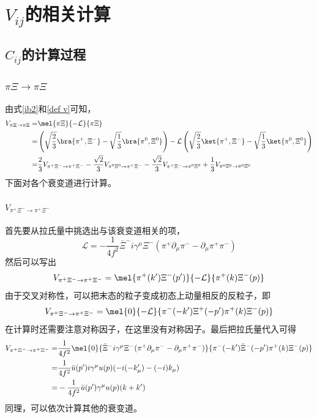 \chapter{$V_{ij}$的相关计算}
\label{appendices a}
\section{$C_{ij}$的计算过程}
\subsection{$\pi\Xi\to\pi\Xi$}
由式\eqref{ib2}和\eqref{def v}可知，
\begin{equation}
\begin{split}
	V_{\pi\Xi\rightarrow\pi\Xi}=&\mel{\pi\Xi}{-\mathcal{L}}{\pi\Xi}\\
	=&\left(\sqrt{\frac{2}{3}}\bra{\pi^{+},\Xi^{-}}-\sqrt{\frac{1}{3}}\bra{\pi^{0},\Xi^{0}}\right)-\mathcal{L}\left(\sqrt{\frac{2}{3}}\ket{\pi^{+},\Xi^{-}}-\sqrt{\frac{1}{3}}\ket{\pi^{0},\Xi^{0}}\right)\\
	=&\frac{2}{3}V_{\pi^{+}\Xi^{-}\rightarrow\pi^{+}\Xi^{-}}-\frac{\sqrt{2}}{3}V_{\pi^{0}\Xi^{0}\rightarrow\pi^{+}\Xi^{-}}-\frac{\sqrt{2}}{3}V_{\pi^{+}\Xi^{-}\rightarrow\pi^{0}\Xi^{0}}+\frac{1}{3}V_{\pi^{0}\Xi^{0}\rightarrow\pi^{0}\Xi^{0}}
\end{split}
\end{equation}
下面对各个衰变道进行计算。
\subsubsection{$V_{\pi^{+}\Xi^{-}\to\pi^{+}\Xi^{-}}$}
首先要从拉氏量中挑选出与该衰变道相关的项，
\begin{equation}
	\mathcal{L}=-\frac{1}{4f^2}\bar{\Xi}^{-}i\gamma^{\mu}\Xi^{-}(\pi^{+}\partial_{\mu}\pi^{-}-\partial_{\mu}\pi^{+}\pi^{-})
\end{equation}
然后可以写出
\begin{equation}
	V_{\pi^{+}\Xi^{-}\rightarrow\pi^{+}\Xi^{-}}=\mel{\pi^{+}(k')\Xi^{-}(p')}{-\mathcal{L}}{\pi^{+}(k)\Xi^{-}(p)}
\end{equation}
由于交叉对称性，可以把末态的粒子变成初态上动量相反的反粒子\cite{peskin2018introduction}，即
\begin{equation}
	V_{\pi^{+}\Xi^{-}\rightarrow\pi^{+}\Xi^{-}}=\mel{0}{-\mathcal{L}}{\pi^{-}(-k')\Xi^{+}(-p')\pi^{+}(k)\Xi^{-}(p)}
\end{equation}
在计算时还需要注意对称因子，在这里没有对称因子。最后把拉氏量代入可得
\begin{equation}
\begin{split}
	V_{\pi^{+}\Xi^{-}\rightarrow\pi^{+}\Xi^{-}}=&\frac{1}{4f^2}\mel{0}{\bar{\Xi}^{-}i\gamma^{\mu}\Xi^{-}(\pi^{+}\partial_{\mu}\pi^{-}-\partial_{\mu}\pi^{+}\pi^{-})}{\pi^{-}(-k')\bar{\Xi}^{-}(-p')\pi^{+}(k)\Xi^{-}(p)}\\
	=&\frac{1}{4f^2}\bar{u}(p')i\gamma^{\mu}u(p)(-i(-k_{\mu}')-(-i)k_{\mu})\\
	=&-\frac{1}{4f^2}\bar{u}(p')\gamma^{\mu}u(p)(k+k')
\end{split}
\end{equation}
同理，可以依次计算其他的衰变道。
